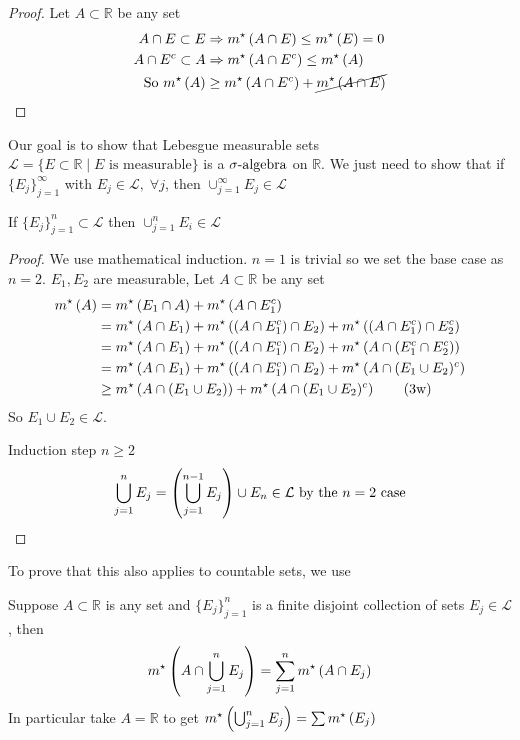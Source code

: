 \begin{proof}
    Let $A \subset \mathbb{R}$ be any set
    \begin{align*}
        A \cap E \subset E &\Rightarrow m^{\star}\left(A \cap E\right) \leq m^{\star}\left(E\right) = 0 \\
        A \cap E^{c} \subset A &\Rightarrow m^{\star}\left(A \cap E^{c}\right) \leq m^{\star}\left(A\right) \\
        \text{ So } m^{\star}\left(A\right) &\geq m^{\star}\left(A \cap E^c\right) + \cancel{m^{\star}\left(A \cap E\right)}
    \end{align*}
\end{proof}

Our goal is to show that Lebesgue measurable sets $\mathcal{L} = \{ E \subset \mathbb{R} \mid E \text{ is measurable} \}$ is a $\sigma\text{-algebra}$ on $\mathbb{R}$.
We just need to show that if $\{ E_j \}_{j=1}^{\infty}$ with $E_j \in \mathcal{L}, \; \forall j$, then $\cup_{j=1}^{\infty} E_j \in \mathcal{L}$

\begin{prop}
    If $\{ E_j \}_{j=1}^{n} \subset \mathcal{L}$ then $\cup_{j=1}^{n} E_i \in \mathcal{L}$
\end{prop}

\begin{proof}
    We use mathematical induction.
    $n=1$ is trivial so we set the base case as $n=2$.
    $E_1, E_2$ are measurable, Let $A \subset \mathbb{R}$ be any set
    \begin{align*}
        m^{\star}\left(A\right) &= m^{\star}\left(E_1 \cap A\right) + m^{\star}\left(A \cap E_1 ^{c}\right) \\
        &= m^{\star}\left(A \cap E_1\right) + m^{\star}\left((A \cap E_1^{c}) \cap E_2\right) + m^{\star}\left((A \cap E_1 ^{c}) \cap E_2 ^{c}\right) \\
        &= m^{\star}\left(A \cap E_1\right) + m^{\star}\left((A \cap E_1^{c}) \cap E_2\right) + m^{\star}\left(A \cap (E_1 ^{c} \cap E_2 ^{c})\right) \\
        &= m^{\star}\left(A \cap E_1\right) + m^{\star}\left((A \cap E_1^{c}) \cap E_2\right) + m^{\star}\left(A \cap (E_1 \cup E_2)^{c}\right)\\
        &\geq m^{\star}\left(A \cap (E_1 \cup E_2)\right) + m^{\star}\left(A \cap (E_1 \cup E_2)^{c}\right) \tag{3w} \\
    \end{align*}
    So $E_1 \cup E_2 \in \mathcal{L}$.

    Induction step $n \geq 2$
    \[
        \bigcup_{j=1}^{n} E_j = \left( \bigcup_{j=1}^{n-1} E_j \right) \cup E_n \in \mathcal{L} \text{ by the $n=2$ case} \qedhere
    \]
\end{proof}

To prove that this also applies to countable sets, we use
\begin{prop}
    Suppose $A \subset \mathbb{R}$ is any set and $\{ E_j \}_{j=1}^{n}$ is a finite disjoint collection of sets $E_j \in \mathcal{L}$, then
\[
    m^{\star}\left(A \cap \bigcup_{j=1}^{n} E_j\right) = \sum_{j=1}^{n} m^{\star}\left(A \cap E_j\right)
\]
    In particular take $A = \mathbb{R}$ to get $m^{\star}\left(\bigcup_{j=1}^{n}E_j\right) = \sum m^{\star}\left(E_j\right)$
\end{prop}

